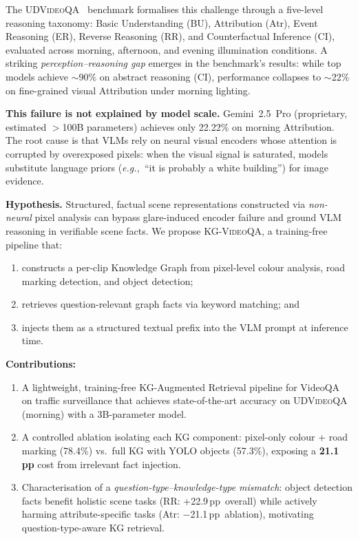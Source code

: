 \documentclass[10pt,conference,compsoc]{IEEEtran}
\newcommand{\ours}{\textsc{KG-VideoQA}}
\newcommand{\dataset}{\textsc{UDVideoQA}}
\newcommand{\pp}{\,pp}                     %
\newcommand{\eg}{\textit{e.g.,}~}
\begin{document}
The \dataset{}~\cite{udvideoqa2026} benchmark formalises this
challenge through a five-level reasoning taxonomy: Basic
Understanding (BU), Attribution (Atr), Event Reasoning (ER),
Reverse Reasoning (RR), and Counterfactual Inference (CI),
evaluated across morning, afternoon, and evening illumination
conditions.
A striking \emph{perception--reasoning gap} emerges in the
benchmark's results: while top models achieve $\sim$90\% on
abstract reasoning (CI), performance collapses to $\sim$22\% on
fine-grained visual Attribution under morning lighting.

\textbf{This failure is not explained by model scale.}
Gemini~2.5~Pro (proprietary, estimated $>$100B parameters) achieves
only 22.22\% on morning Attribution.
The root cause is that VLMs rely on neural visual encoders whose
attention is corrupted by overexposed pixels: when the visual
signal is saturated, models substitute language priors
(\eg ``it is probably a white building'') for image evidence.

\textbf{Hypothesis.}
Structured, factual scene representations constructed via
\emph{non-neural} pixel analysis can bypass glare-induced
encoder failure and ground VLM reasoning in verifiable scene facts.
We propose \ours{}, a training-free pipeline that:
\begin{enumerate}[label=(\roman*)]
  \item constructs a per-clip Knowledge Graph from pixel-level
        colour analysis, road marking detection, and object detection;
  \item retrieves question-relevant graph facts via keyword matching; and
  \item injects them as a structured textual prefix into the VLM
        prompt at inference time.
\end{enumerate}

\textbf{Contributions:}
\begin{enumerate}
  \item A lightweight, training-free KG-Augmented Retrieval
        pipeline for VideoQA on traffic surveillance that achieves
        state-of-the-art accuracy on \dataset{} (morning) with
        a 3B-parameter model.

  \item A controlled ablation isolating each KG component:
        pixel-only colour + road marking (78.4\%) vs.\ full KG
        with YOLO objects (57.3\%), exposing a \textbf{21.1\pp}
        cost from irrelevant fact injection.

  \item Characterisation of a \emph{question-type--knowledge-type
        mismatch}: object detection facts benefit holistic
        scene tasks (RR: +22.9\pp\ overall) while actively harming
        attribute-specific tasks (Atr: $-$21.1\pp\ ablation),
        motivating question-type-aware KG retrieval.
\end{enumerate}
\end{document}
